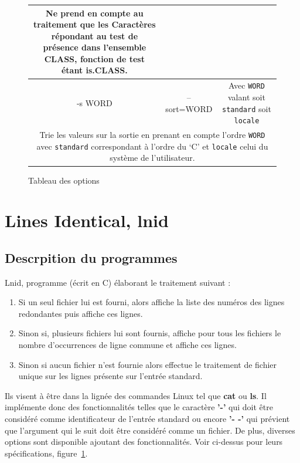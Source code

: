 \documentclass[12pt]{article}
\begin{document}
\begin{figure}[H]
\begin{tabular}{|c|c|c|}
{                \parbox{15cm}{Ne prend en compte au traitement que les 
                Caractères répondant au test  de présence dans l'ensemble 
                CLASS, fonction de test étant is.CLASS.}}\\[.8em]
            \hline
                \cellcolor{blue-s!25} -s WORD & \cellcolor{blue-s!25} 
                --sort=WORD & \cellcolor{blue-t!70}Avec \texttt{WORD} valant
                 soit \texttt{standard} soit \texttt{locale} \\
            \hline
                \multicolumn{3}{|c|}{\cellcolor{blue-u!7}\rule{0pt}{2em}
                \parbox{15cm}{{Trie les valeurs sur la sortie en prenant en 
                compte l'ordre \texttt{WORD} avec \texttt{standard}} 
                correspondant à l'ordre du  `C' et \texttt{locale} celui du 
                système de l'utilisateur.}}\\[1em]
            \hline
        \end{tabular}
        \captionsetup{position=bottom}
        \caption{Tableau des options}\label{table-opt}
    \end{figure}

    \newpage

    \section{Lines Identical, lnid}

    \subsection{Descrpition du programmes}

    Lnid, programme (écrit en C) élaborant le traitement suivant :
    \begin{enumerate}
        \item[] Si un seul fichier lui est fourni, alors affiche la liste 
        des numéros des lignes redondantes puis affiche ces lignes.
        \item[] Sinon si, plusieurs fichiers lui sont fournis, affiche pour
         tous les fichiers le nombre d'occurrences de ligne commune et 
         affiche ces lignes.
        \item[] Sinon si aucun fichier n'est fournie alors effectue le 
        traitement de fichier unique sur les lignes présente sur l'entrée 
        standard.
    \end{enumerate}

    Ils visent à être dans la lignée des commandes Linux tel que \textbf{cat} ou 
    \textbf{ls}. Il implémente donc des fonctionnalités telles que le caractère 
    \textbf{'-'} qui doit être considéré comme identificateur de l'entrée 
    standard ou encore \textbf{'- -'} qui prévient que l'argument qui le suit 
    doit être considéré comme un fichier. De plus, diverses options sont 
    disponible ajoutant des fonctionnalités. Voir ci-dessus pour leurs 
    spécifications, figure~\ref{table-opt}.
\end{document}
